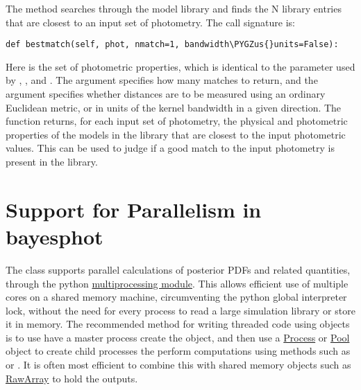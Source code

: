 \documentclass[letterpaper,10pt,english]{sphinxmanual}
\def\PYGZus{\char`\_}
\begin{document}
The  method searches through the model library and finds the N library entries that are closest to an input set of photometry. The call signature is:

\begin{Verbatim}[commandchars=\\\{\}]
def bestmatch(self, phot, nmatch=1, bandwidth\PYGZus{}units=False):
\end{Verbatim}

Here  is the set of photometric properties, which is identical to the  parameter used by , , and . The argument  specifies how many matches to return, and the argument  specifies whether distances are to be measured using an ordinary Euclidean metric, or in units of the kernel bandwidth in a given direction. The function returns, for each input set of photometry, the physical and photometric properties of the  models in the library that are closest to the input photometric values. This can be used to judge if a good match to the input photometry is present in the library.


\section{Support for Parallelism in bayesphot}
\label{bayesphot:ssec-bayesphot-threading}\label{bayesphot:support-for-parallelism-in-bayesphot}
The  class supports parallel calculations of posterior PDFs and
related quantities, through the python \href{https://docs.python.org/2.7/library/multiprocessing.html}{multiprocessing module}. This
allows efficient use of multiple cores on a shared memory machine,
circumventing the python global interpreter lock, without the need for
every process to read a large simulation library or store it in
memory. The recommended method for writing threaded code using 
objects is to use have a master process create the  object, and
then use a \href{https://docs.python.org/2.7/library/multiprocessing.html\#multiprocessing.Process}{Process}
or \href{https://docs.python.org/2.7/library/multiprocessing.html\#module-multiprocessing.pool}{Pool}
object to create child processes the perform computations using 
methods such as  or . It is often most efficient
to combine this with shared memory objects such as \href{https://docs.python.org/2.7/library/multiprocessing.html\#module-multiprocessing.sharedctypes}{RawArray}
to hold the outputs.
\end{document}

